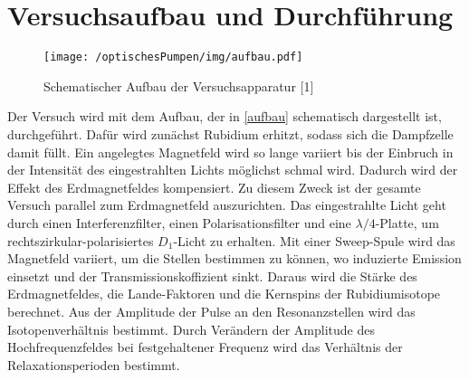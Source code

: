 \section{Versuchsaufbau und Durchführung}

\begin{figure}[h]
\centering
\texttt{[image: /optischesPumpen/img/aufbau.pdf]}
\caption{Schematischer Aufbau der Versuchsapparatur [1]}
\label{aufbau}
\end{figure}

Der Versuch wird mit dem Aufbau, der in \autoref{aufbau} schematisch dargestellt ist, durchgeführt. Dafür wird zunächst
Rubidium erhitzt, sodass sich die Dampfzelle damit füllt. Ein angelegtes Magnetfeld wird so lange variiert bis der Einbruch
in der Intensität des eingestrahlten Lichts möglichst schmal wird. Dadurch wird der Effekt des Erdmagnetfeldes kompensiert.
Zu diesem Zweck ist der gesamte Versuch parallel zum Erdmagnetfeld auszurichten. Das eingestrahlte Licht geht durch einen
Interferenzfilter, einen Polarisationsfilter und eine $\lambda/4$-Platte, um rechtszirkular-polarisiertes $D_1$-Licht zu
erhalten. Mit einer Sweep-Spule wird das Magnetfeld variiert, um die Stellen bestimmen zu können, wo induzierte Emission
einsetzt und der Transmissionskoffizient sinkt. Daraus wird die Stärke des Erdmagnetfeldes, die Lande-Faktoren und die
Kernspins der Rubidiumisotope berechnet. Aus der Amplitude der Pulse an den Resonanzstellen wird das Isotopenverhältnis
bestimmt. Durch Verändern der Amplitude des Hochfrequenzfeldes bei festgehaltener Frequenz wird das Verhältnis der
Relaxationsperioden bestimmt.
